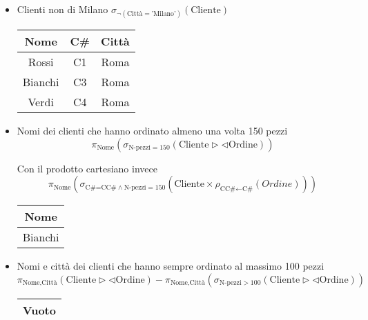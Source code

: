 \documentclass{article}
\begin{document}
\begin{itemize}
    
    \item Clienti non di Milano $\sigma_{\neg(\text{Città}=\text{'Milano'})}(\text{Cliente})$

    \begin{table}[H]
        \centering
        \begin{tabular}{c|c|c}
            \textbf{Nome} & \textbf{C\#} & \textbf{Città}\\
            \hline
            Rossi & C1 & Roma\\
            \hline
            Bianchi & C3 & Roma\\
            \hline
            Verdi & C4 & Roma\\
        \end{tabular}
    \end{table}
    
    \item Nomi dei clienti che hanno ordinato almeno una volta 150 pezzi $$\pi_{\text{Nome}}(\sigma_{\text{N-pezzi}=150}(\text{Cliente}\triangleright\triangleleft\text{Ordine}))$$

    Con il prodotto cartesiano invece $$\pi_{\text{Nome}}(\sigma_{\text{C\#=CC\#}\wedge\text{N-pezzi}=150}(\text{Cliente}\times\rho_{\text{CC\#$\leftarrow$C\#}}(Ordine)))$$

    \begin{table}[H]
        \centering
        \begin{tabular}{c}
            \textbf{Nome}\\
            \hline
            Bianchi
        \end{tabular}
    \end{table}    
    
    \item Nomi e città dei clienti che hanno sempre ordinato al massimo 100 pezzi $$\pi_{\text{Nome,Città}}(\text{Cliente}\triangleright\triangleleft\text{Ordine})-\pi_{\text{Nome,Città}}(\sigma_{\text{N-pezzi}>100}(\text{Cliente}\triangleright\triangleleft\text{Ordine}))$$

    \begin{table}[H]
        \centering
        \begin{tabular}{|c|}
            \hline
            Vuoto\\
            \hline
        \end{tabular}
    \end{table}
    
\end{itemize}
\end{document}
